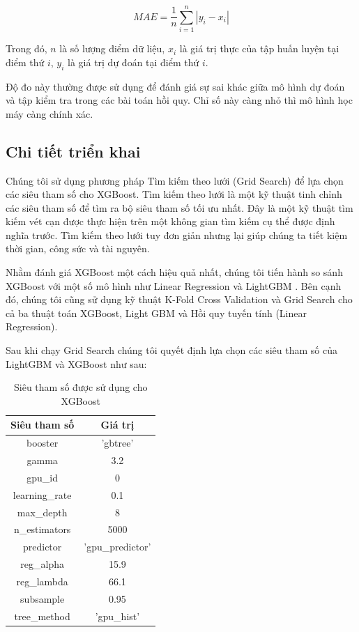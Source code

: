 \documentclass{article}
\begin{document}
\begin{equation}
    MAE = \frac{1}{n}\sum_{i=1}^{n}{| y_{i} - x_{i} |} 
\end{equation} 

Trong đó, $n$ là số lượng điểm dữ liệu, $x_i$ là giá trị thực của tập huấn luyện tại điểm thứ $i$, $y_i$ là giá trị dự đoán tại điểm thứ $i$.

Độ đo này thường được sử dụng để đánh giá sự sai khác giữa mô hình dự đoán và tập kiểm tra trong các bài toán hồi quy. Chỉ số này càng nhỏ thì mô hình học máy càng chính xác.

\subsection{Chi tiết triển khai}
Chúng tôi sử dụng phương pháp Tìm kiếm theo lưới (Grid Search) \cite{gridsearch} để lựa chọn các siêu tham số cho XGBoost. Tìm kiếm theo lưới là một kỹ thuật tinh chỉnh các siêu tham số để tìm ra bộ siêu tham số tối ưu nhất. Đây là một kỹ thuật tìm kiếm vét cạn được thực hiện trên một không gian tìm kiếm cụ thể được định nghĩa trước. Tìm kiếm theo lưới tuy đơn giản nhưng lại giúp chúng ta tiết kiệm thời gian, công sức và tài nguyên.

Nhằm đánh giá XGBoost một cách hiệu quả nhất, chúng tôi tiến hành so sánh XGBoost với một số mô hình như Linear Regression và LightGBM \cite{lightgbm}. Bên cạnh đó, chúng tôi cũng sử dụng kỹ thuật K-Fold Cross Validation và Grid Search cho cả ba thuật toán XGBoost, Light GBM và Hồi quy tuyến tính (Linear Regression).

Sau khi chạy Grid Search chúng tôi quyết định lựa chọn các siêu tham số của LightGBM và XGBoost như sau:

\begin{center}
    \begin{table}[h!]
    \begin{tabular}{|c|c|}
        \hline
        Siêu tham số & Giá trị \\
        \hline 
        booster & 'gbtree' \\
        \hline 
        gamma & 3.2\\
        \hline 
        gpu\_id & 0 \\
        \hline
        learning\_rate & 0.1\\
        \hline 
        max\_depth & 8 \\
        \hline 
        n\_estimators & 5000\\
        \hline 
        predictor & 'gpu\_predictor' \\
        \hline 
        reg\_alpha & 15.9 \\
        \hline 
        reg\_lambda & 66.1\\
        \hline 
        subsample & 0.95\\ 
        \hline 
        tree\_method & 'gpu\_hist'\\
        \hline
    \end{tabular}
    \caption{Siêu tham số được sử dụng cho XGBoost}
    \label{tab: table-xgboost} 
    \end{table}
\end{center}
\end{document}
